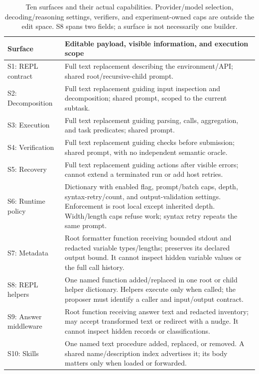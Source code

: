 \begin{table}[t]
\centering\small
\renewcommand{\arraystretch}{1.12}
\begin{tabularx}{\textwidth}{@{}p{}X@{}}
\toprule
Surface & Editable payload, visible information, and execution scope \\
\midrule
S1: REPL contract & Full text replacement describing the environment/API; shared root/recursive-child prompt. \\
S2: Decomposition & Full text replacement guiding input inspection and decomposition; shared prompt, scoped to the current subtask. \\
S3: Execution & Full text replacement guiding parsing, calls, aggregation, and task predicates; shared prompt. \\
S4: Verification & Full text replacement guiding checks before submission; shared prompt, with no independent semantic oracle. \\
S5: Recovery & Full text replacement guiding actions after visible errors; cannot extend a terminated run or add host retries. \\
S6: Runtime policy & Dictionary with enabled flag, prompt/batch caps, depth, syntax-retry/count, and output-validation settings. Enforcement is root local except inherited depth. Width/length caps refuse work; syntax retry repeats the same prompt. \\
S7: Metadata & Root formatter function receiving bounded stdout and redacted variable types/lengths; preserves its declared output bound. It cannot inspect hidden variable values or the full call history. \\
S8: REPL helpers & One named function added/replaced in one root or child helper dictionary. Helpers execute only when called; the proposer must identify a caller and input/output contract. \\
S9: Answer middleware & Root function receiving answer text and redacted inventory; may accept transformed text or redirect with a nudge. It cannot inspect hidden records or classifications. \\
S10: Skills & One named text procedure added, replaced, or removed. A shared name/description index advertises it; its body matters only when loaded or forwarded. \\
\bottomrule
\end{tabularx}
\caption{Ten surfaces and their actual capabilities. Provider/model selection,
decoding/reasoning settings, verifiers, and experiment-owned caps are outside the
edit space. S8 spans two fields; a surface is not necessarily one builder.}
\label{tab:surfaces}
\end{table}

